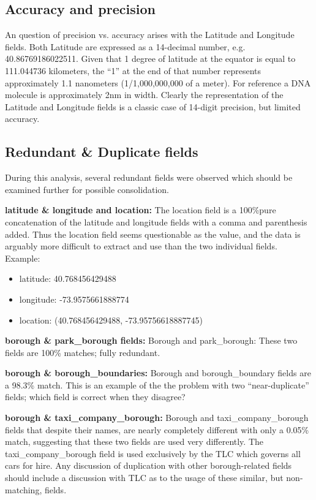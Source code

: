 \documentclass[12pt, titlepage]{article}
\begin{document}
	
\subsection{Accuracy and precision}
\label{sec:precision}
An question of precision vs. accuracy arises with the Latitude 
and Longitude fields. Both Latitude are expressed as 
a 14-decimal number, e.g. 40.86769186022511. Given 
that 1 degree of latitude at the equator is equal to 111.044736 
kilometers, the ``1'' at the end of that number represents 
approximately 1.1 nanometers (1/1,000,000,000 of a meter). For 
reference a DNA molecule is approximately 2nm in width. Clearly 
the representation of the Latitude and Longitude fields is a 
classic case of 14-digit precision, but limited accuracy. 


\subsection{Redundant \& Duplicate fields}
\label{sec:duplicates}
During this analysis, several redundant fields were observed which
should be examined further for possible consolidation.


\label{sec:latlong}
\textbf{latitude \& longitude and location:} The location 
field is a 100\%pure concatenation of the latitude 
and longitude fields with a comma and parenthesis 
added. Thus the  location field seems questionable as the value, 
and the data is arguably more difficult to 
extract and use than the two individual fields. Example:  


\begin{itemize}
	\item  latitude: 40.768456429488
	
	\item  longitude: -73.9575661888774
	
	\item  location: (40.768456429488, -73.95756618887745)
\end{itemize}


\label{sec:parkborough}
\textbf{borough \&  park\_borough fields:} Borough and 
park\_borough: These two fields are 100\% matches; fully redundant.


\label{sec:boroughboundaries}
\textbf{borough \& borough\_boundaries:} Borough and 
borough\_boundary fields are a 98.3\% match. This 
is an example of the the problem with two ``near-duplicate'' 
fields; which field is correct when they disagree?


\label{sec:taxicompanyborough}
\textbf{borough \& taxi\_company\_borough:} Borough and 
taxi\_company\_borough fields that despite their names, are 
nearly completely different with only a 0.05\% match, suggesting 
that these two fields are used very differently. The taxi\_company\_borough
 field is used exclusively by the TLC which governs all cars for hire. Any
 discussion of duplication with other borough-related fields 
 should include a discussion with TLC as to the usage of these similar,
 but non-matching, fields.
 
\end{document}
